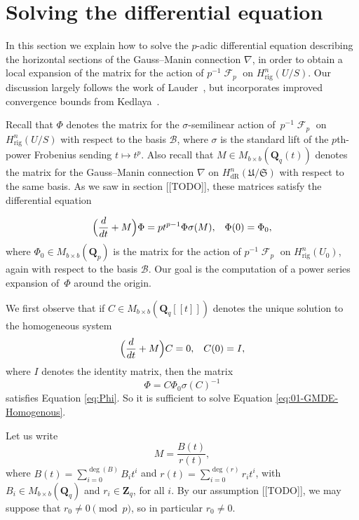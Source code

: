 \documentclass[a4paper,11pt]{article}
\numberwithin{equation}{section}
\newcommand{\ZZ}{\mathbf{Z}} %
\newcommand{\QQ}{\mathbf{Q}} %
\DeclareMathOperator{\Frob}{\mathcal{F}} %
\providecommand{\HdR}{H_{\text{dR}}}    %
\providecommand{\Hrig}{H_{\text{rig}}}  %
\providecommand{\cB}{\mathcal{B}} %
\theoremstyle{definition}
\begin{document}

\section{Solving the differential equation}
\label{sec:DifferentialSystem}

In this section we explain how to solve the $p$-adic differential 
equation describing the horizontal sections of the Gauss--Manin 
connection $\nabla$, in order to obtain a local expansion of the 
matrix for the action of $p^{-1} \Frob_p$ on $\Hrig^{n}(U/S)$.  
Our discussion largely follows the work of Lauder~\citep{Lauder2006}, 
but incorporates improved convergence bounds from Kedlaya~\citep{Kedlaya2010}.



Recall that $\Phi$ denotes the matrix for the $\sigma$-semilinear action
of~$p^{-1} \Frob_p$ on $\Hrig^{n}(U/S)$ with respect to the basis $\cB$, 
where $\sigma$ is the standard lift of the $p$th-power Frobenius sending 
$t \mapsto t^p$. Also recall that $M \in M_{b \times b}(\QQ_q(t))$ denotes 
the matrix for the Gauss--Manin connection $\nabla$ on $\HdR^n(\mathfrak{U}/\mathfrak{S})$
with respect to the same basis. As we saw in section [[TODO]], these matrices 
satisfy the differential equation

\begin{equation} \label{eq:Phi}
\Bigl(\frac{d}{dt} + M\Bigr) \Phi = p t^{p-1} \Phi \sigma(M), \; \; \; \Phi(0)=\Phi_0,
\end{equation}
where $\Phi_0 \in M_{b \times b}(\QQ_p)$ is the matrix for the action of $p^{-1} \Frob_p$ 
on $\Hrig^n(U_0)$, again with respect to the basis $\cB$. Our goal is 
the computation of a power series expansion of~$\Phi$ around the origin.

We first observe that if $C \in M_{b \times b}(\QQ_q[[t]])$ denotes the unique solution to the 
homogeneous system
\begin{equation} \label{eq:01-GMDE-Homogenous}
\Bigl(\frac{d}{dt} + M\Bigr) C = 0, \; \; \; C(0)=I,
\end{equation}
where $I$ denotes the identity matrix, then the matrix
\begin{equation*}
\Phi = C \Phi_0 \sigma(C)^{-1}
\end{equation*}
satisfies Equation \eqref{eq:Phi}. So it is sufficient to solve Equation 
\eqref{eq:01-GMDE-Homogenous}.

Let us write 
\begin{equation*}
M = \frac{B(t)}{r(t)},
\end{equation*}
where $B(t) = \sum_{i=0}^{\deg(B)} B_i t^i$ and $r(t)= \sum_{i=0}^{\deg(r)} r_i t^i$,
with $B_i \in M_{b \times b}(\QQ_q)$ and $r_i \in \ZZ_q$, for all $i$. By our assumption 
[[TODO]], we may suppose that $r_0 \neq 0 \pmod{p}$, so in particular $r_0 \neq 0$.
\end{document}
